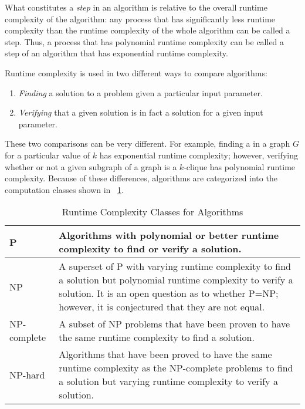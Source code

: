 What constitutes a \emph{step} in an algorithm is relative to the overall runtime complexity of the algorithm: any
process that has significantly less runtime complexity than the runtime complexity of the whole algorithm can be
called a step.  Thus, a process that has polynomial runtime complexity can be called a step of an algorithm that
has exponential runtime complexity.

Runtime complexity is used in two different ways to compare algorithms:
\begin{enumerate}
\item \emph{Finding} a solution to a problem given a particular input parameter.
\item \emph{Verifying} that a given solution is in fact a solution for a given input parameter.
\end{enumerate}

These two comparisons can be very different.  For example, finding a  in a graph \(G\) for a particular
value of \(k\) has exponential runtime complexity; however, verifying whether or not a given subgraph of a graph is
a \(k\)-clique has polynomial runtime complexity.  Because of these differences, algorithms are categorized into
the computation classes shown in \tablename~\ref{tab:classes}.

\begin{table}[H]
  \centering
  \caption{Runtime Complexity Classes for Algorithms}
  \label{tab:classes}
  \setlength{\extrarowheight}{2ex}
  \begin{tabular}{|m{1in}|m{3in}|}
    \hline
    P & Algorithms with polynomial or better runtime complexity to find or verify a solution. \\
    \hline
    NP & A superset of P with varying runtime complexity to find a solution but polynomial runtime complexity to
    verify a solution.  It is an open question as to whether P=NP; however, it is conjectured that they are not
    equal. \\
    \hline
    NP-complete & A subset of NP problems that have been proven to have the same runtime complexity to find a
    solution. \\
    \hline
    NP-hard & Algorithms that have been proved to have the same runtime complexity as the NP-complete problems to
    find a solution but varying runtime complexity to verify a solution. \\
    \hline
  \end{tabular}
\end{table}

